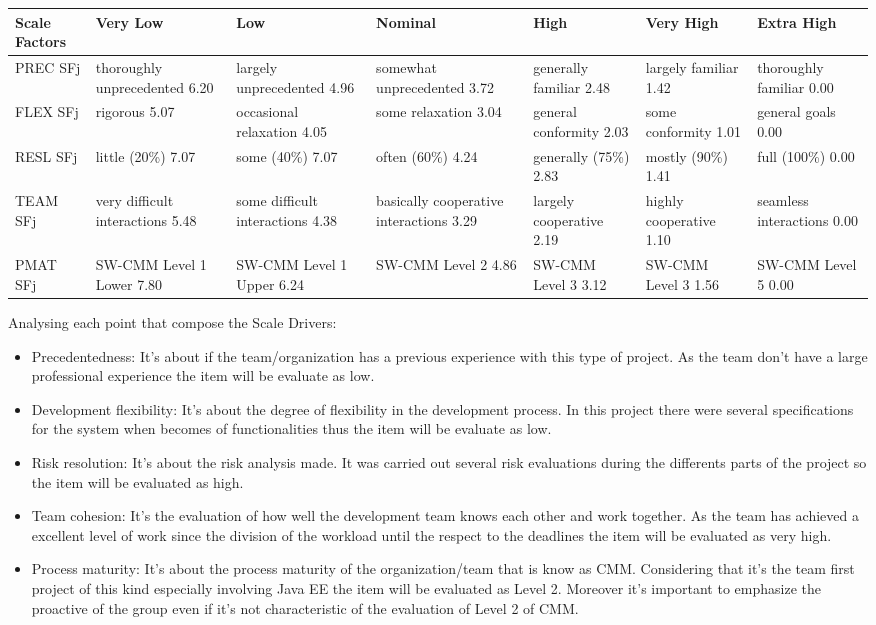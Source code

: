 \documentclass[a4paper]{article}
\begin{document}
\begin{tabular}{ | L{1.5cm} | L{3cm} | L{3cm} | L{3cm} | L{3cm} | L{3cm} | L{3cm} |}

\hline
	\textbf {Scale Factors} & \textbf {Very Low} & \textbf {Low} & \textbf {Nominal} & \textbf {High} & \textbf {Very High} & \textbf {Extra High} \\ \hline
	PREC  SFj  & thoroughly unprecedented 6.20 & largely unprecedented 4.96 & somewhat unprecedented 3.72 & generally familiar 2.48 & largely familiar 1.42& thoroughly familiar 0.00  \\ \hline
	FLEX SFj  &rigorous 5.07 &occasional relaxation 4.05 &some relaxation 3.04 &general conformity 2.03 & some conformity 1.01& general goals 0.00  \\ \hline
	RESL SFj  &little (20\%) 7.07&some (40\%) 7.07 & often (60\%) 4.24& generally (75\%) 2.83&mostly
(90\%) 1.41&full (100\%) 0.00\\ \hline
	TEAM SFj  &very difficult interactions 5.48 &some difficult interactions 4.38 &basically cooperative interactions 3.29 & largely cooperative 2.19 & highly cooperative 1.10& seamless interactions 0.00  \\ \hline
	PMAT SFj  &SW-CMM Level 1 Lower 7.80&SW-CMM Level 1 Upper 6.24&SW-CMM Level 2 4.86&SW-CMM Level 3 3.12&SW-CMM Level 3  1.56&SW-CMM Level 5  0.00\\ \hline
\end{tabular}

\newpage
Analysing each point that compose the Scale Drivers:
\begin{itemize}
\item Precedentedness: It's about if the team/organization has a previous experience with this type of project. As the team don't have a large professional experience the item will be evaluate as low.
\item Development flexibility: It's about the degree of flexibility in the development process. In this project there were several specifications for the system when becomes of functionalities thus the item will be evaluate as low.
\item Risk resolution: It's about the risk analysis made. It was carried out several risk evaluations during the differents parts of the project so the item will be evaluated as high.
\item Team cohesion: It's the evaluation of how well the development team knows each other and work together. As the team has achieved a excellent level of work since the division of the workload until the respect to the deadlines the item will be evaluated as very high.
\item Process maturity: It's about the process maturity of the organization/team that is know as CMM. Considering that it's the team first project of this kind especially involving Java EE the item will be evaluated as Level 2. Moreover it's important to emphasize the proactive of the group even if it's not characteristic of the evaluation of Level 2 of CMM. 
\end{itemize}
	
\end{document}
